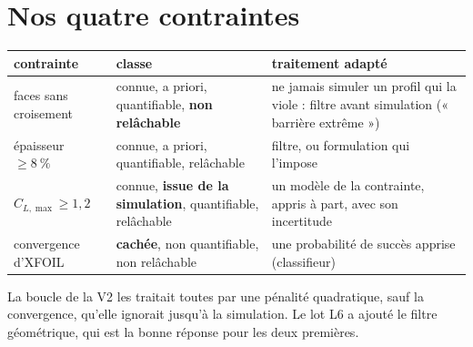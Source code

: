 \section{Nos quatre contraintes}
\begin{center}
\renewcommand{\arraystretch}{1.25}
\small
\begin{tabularx}{\linewidth}{>{\raggedright\arraybackslash}p{3.1cm} >{\raggedright\arraybackslash}p{3.8cm} >{\raggedright\arraybackslash}X}
\toprule
contrainte & classe & traitement adapté \\
\midrule
faces sans croisement & connue, a priori, quantifiable, \textbf{non relâchable} & ne jamais simuler un profil qui la viole : filtre avant simulation (« barrière extrême ») \\
épaisseur $\ge8~\%$ & connue, a priori, quantifiable, relâchable & filtre, ou formulation qui l'impose \\
$C_{L,\max}\ge1{,}2$ & connue, \textbf{issue de la simulation}, quantifiable, relâchable & un modèle de la contrainte, appris à part, avec son incertitude \\
convergence d'XFOIL & \textbf{cachée}, non quantifiable, non relâchable & une probabilité de succès apprise (classifieur) \\
\bottomrule
\end{tabularx}
\end{center}
La boucle de la V2 les traitait toutes par une pénalité quadratique, sauf la convergence, qu'elle ignorait jusqu'à la simulation. Le lot L6 a ajouté le filtre géométrique, qui est la bonne réponse pour les deux premières.

